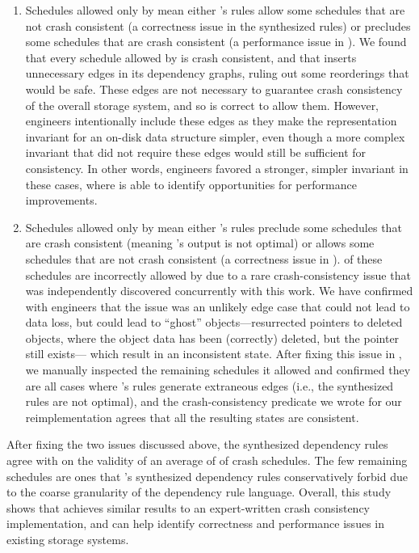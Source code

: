 \begin{enumerate}[left=0pt]
\item Schedules allowed only by \depsynth mean either
\depsynth's rules allow some schedules that are not crash consistent
(a correctness issue in the synthesized rules)
or \shardstore precludes some schedules that are crash consistent
(a performance issue in \shardstore). 
We found that every schedule allowed by \depsynth is crash consistent,
and that \shardstore inserts unnecessary edges in its dependency graphs,
ruling out some reorderings that would be safe.
These edges are not necessary to guarantee crash consistency of the overall storage system,
and so \depsynth is correct to allow them.
However, \shardstore engineers intentionally include these edges as they make
the representation invariant for an on-disk data structure simpler,
even though a more complex invariant that did not require these edges would still be sufficient for consistency.
In other words, \shardstore engineers favored a stronger, simpler invariant in these cases,
where \depsynth is able to identify opportunities for performance improvements.

\item Schedules allowed only by \shardstore mean either
\depsynth's rules preclude some schedules that are crash consistent
(meaning \depsynth's output is not optimal)
or \shardstore allows some schedules that are not crash consistent
(a correctness issue in \shardstore).
\shardstoreresetschedulespct{} of these schedules are incorrectly allowed by \shardstore
due to a rare crash-consistency issue
that was independently discovered concurrently with this work.
We have confirmed with \shardstore engineers that
the issue was an unlikely edge case that could not lead to data loss,
but could lead to ``ghost'' objects---resurrected pointers to deleted objects,
where the object data has been (correctly) deleted,
but the pointer still exists---%
which result in an inconsistent state.
After fixing this issue in \shardstore,
we manually inspected the remaining schedules it allowed
and confirmed they are all cases where \depsynth's rules generate extraneous edges
(i.e., the synthesized rules are not optimal),
and the crash-consistency predicate we wrote for our \shardstore reimplementation
agrees that all the resulting states are consistent.
\end{enumerate}
%
After fixing the two \shardstore issues discussed above,
the synthesized dependency rules agree with \shardstore on the validity of an average of \shardstoreagreementafterfixes{} of crash schedules.
The few remaining schedules are ones that \depsynth's synthesized dependency rules 
conservatively forbid due to the coarse granularity of the dependency rule language.
Overall, this study shows that \depsynth achieves similar results to an expert-written crash consistency implementation,
and can help identify correctness and performance issues in existing storage systems.

